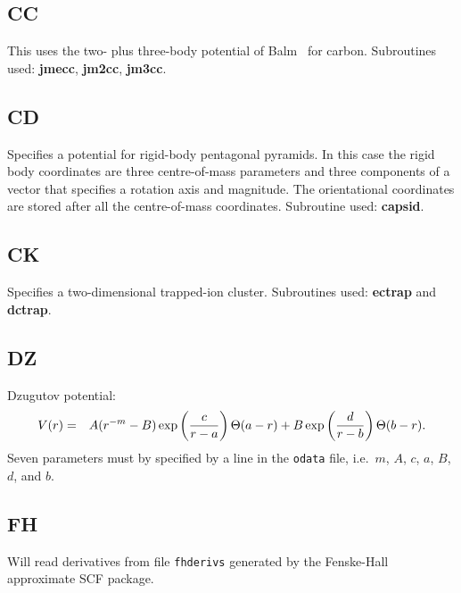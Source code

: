 {{{\subsection{CC}This uses the two- plus three-body potential of Balm \etal\ for carbon.\cite{balmakm91} 
Subroutines used: {\bf jmecc}, {\bf jm2cc}, {\bf jm3cc}.

\subsection{CD}Specifies a potential for rigid-body pentagonal pyramids. In this case the
rigid body coordinates are three centre-of-mass parameters and three components of a 
vector that specifies a rotation axis and magnitude. The orientational coordinates are stored
after all the centre-of-mass coordinates. Subroutine used: {\bf capsid}.


\subsection{CK}Specifies a two-dimensional trapped-ion cluster. Subroutines used:
{\bf ectrap} and {\bf dctrap}.

\subsection{DZ}Dzugutov potential:\cite{Dzugutov92,Dzugutov93b}
\begin{eqnarray}
V(r)&=&A(r^{-m}-B) \exp\left( {c\over r-a}\right) \Theta(a-r) + 
    B \exp\left({d\over r-b}\right) \Theta(b-r). \nonumber
\end{eqnarray}
Seven parameters must by specified by a {} line in the {\tt odata} file,
i.e.~$m$, $A$, $c$, $a$, $B$, $d$, and $b$.

\subsection{FH}Will read derivatives from file {\tt fhderivs} generated by the Fenske-Hall approximate
SCF package.\cite{hallf72}

}}}
